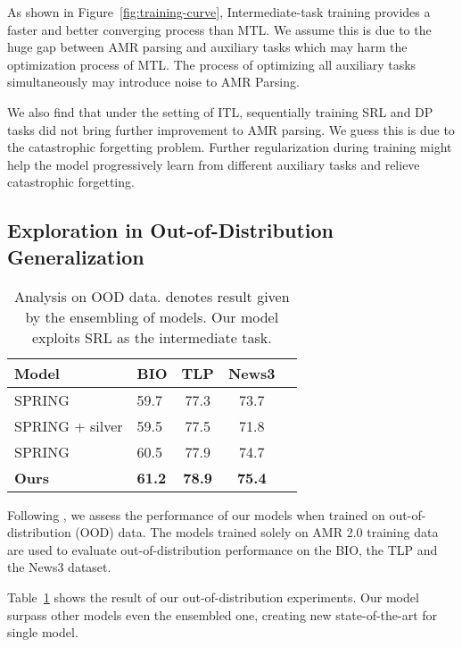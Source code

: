 \documentclass[11pt]{article}
\begin{document}
As shown in Figure~\ref{fig:training-curve}, Intermediate-task training provides a faster and better converging process than MTL. We assume this is due to the huge gap between AMR parsing and auxiliary tasks which may harm the optimization process of MTL. The process of optimizing all auxiliary tasks simultaneously may introduce noise to AMR Parsing. 

We also find that under the setting of ITL, sequentially training SRL and DP tasks did not bring further improvement to AMR parsing. We guess this is due to the catastrophic forgetting problem. Further regularization during training might help the model progressively learn from different auxiliary tasks and relieve catastrophic forgetting. 








\subsection{Exploration in Out-of-Distribution Generalization} \begin{table}[t]
    \centering
    \footnotesize
\begin{tabular}{llccc}
        \toprule
          Model&BIO & TLP &News3 \\
        \midrule
         SPRING & 59.7 & 77.3 & 73.7\\
         SPRING + silver &59.5 & 77.5 &71.8 \\
         SPRING & 60.5 & 77.9 &74.7 \\
         \textbf{Ours} &\textbf{61.2} & \textbf{78.9} & \textbf{75.4} \\
        
        \bottomrule
    \end{tabular}
\caption{Analysis on OOD data.  denotes result given by the ensembling of models. Our model exploits SRL as the intermediate task.}

    \label{tab:ood}
\end{table} 
Following \citet{bevil-spring,lam2021ensembling}, we assess the performance of our models when trained on out-of-distribution (OOD) data. The models trained solely on AMR 2.0 training data are used to evaluate out-of-distribution performance on the BIO, the TLP and the News3 dataset.


Table~\ref{tab:ood} shows the result of our out-of-distribution experiments. Our model surpass other models even the ensembled one\citep{lam2021ensembling}, creating new state-of-the-art for single model. 
\end{document}
